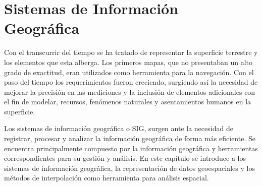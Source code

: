 \chapter{Sistemas de Información Geográfica}
Con el transcurrir del tiempo se ha tratado de representar la superficie terrestre y los elementos
que esta alberga. Los primeros mapas, que no presentaban un alto grado de exactitud, eran
utilizados como herramienta para la navegación. Con el paso del tiempo los requerimientos fueron
creciendo, surgiendo así la necesidad de mejorar la precisión en las mediciones y la inclusión de
elementos adicionales con el fin de modelar, recursos, fenómenos naturales y asentamientos humanos
en la superficie.

Los sistemas de información geográfica o SIG, surgen ante la necesidad de registrar, procesar y
analizar la información geográfica de forma más eficiente. Se encuentra principalmente compuesto
por la información geográfica y herramientas correspondientes para su gestión y análisis. En este
capítulo se introduce a los sistemas de información geográfica, la representación de datos
geoespaciales y los métodos de interpolación como herramienta para análisis espacial.







